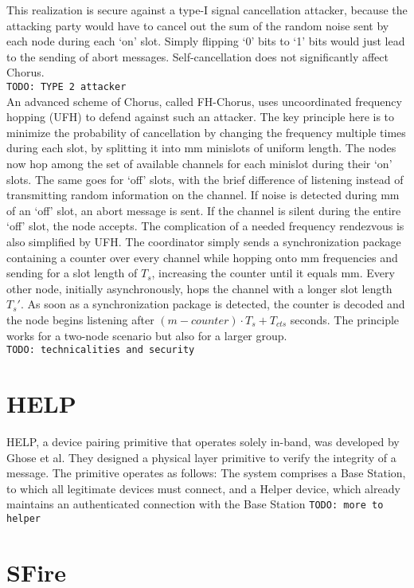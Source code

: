 \documentclass[conference]{IEEEtran}
\begin{document}
This realization is secure against a type-I signal cancellation attacker, because the attacking party would have to cancel out the sum of the random noise sent by each node during each `on' slot. Simply flipping `0' bits to `1' bits would just lead to the sending of abort messages. Self-cancellation does not significantly affect Chorus. \\
\texttt{TODO: TYPE 2 attacker} \\
An advanced scheme of Chorus, called FH-Chorus, uses uncoordinated frequency hopping (UFH) to defend against such an attacker. The key principle here is to minimize the probability of cancellation by changing the frequency multiple times during each slot, by splitting it into mm minislots of uniform length.
The nodes now hop among the set of available channels for each minislot during their `on' slots. The same goes for `off' slots, with the brief difference of listening instead of transmitting random information on the channel. If noise is detected during mm of an `off' slot, an abort message is sent. If the channel is silent during the entire `off' slot, the node accepts.
The complication of a needed frequency rendezvous is also simplified by UFH. The coordinator simply sends a synchronization package containing a counter over every channel while hopping onto mm frequencies and sending for a slot length of $T_s$, increasing the counter until it equals mm. Every other node, initially
asynchronously, hops the channel with a longer slot length $T_s'$. As soon as a synchronization package is detected, the counter is decoded and the node begins listening after $(m-counter) \cdot T_s + T_{cts}$ seconds.
The principle works for a two-node scenario but also for a larger group. \\
\texttt{TODO: technicalities and security}

\section{HELP}
HELP, a device pairing primitive that operates solely in-band, was developed by Ghose et al. They designed a physical layer primitive to verify the integrity of a message. The primitive operates as follows: The system comprises a Base Station, to which all legitimate devices must connect, and a Helper device, which already maintains an authenticated connection with the Base Station \texttt{TODO: more to helper}\\


\section{SFire}
\end{document}
